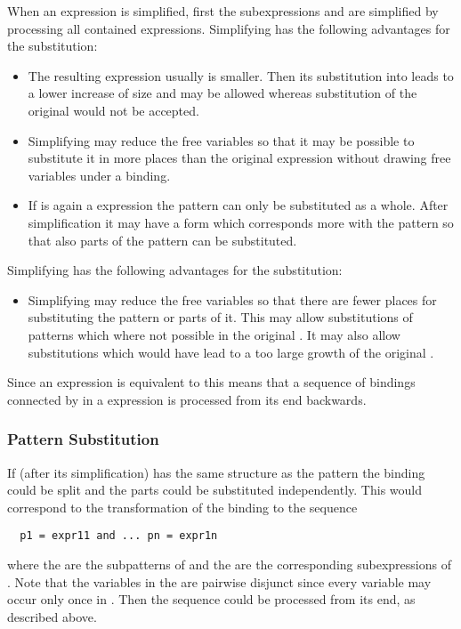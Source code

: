 When an expression  is simplified, first the subexpressions  and  are
simplified by processing all contained  expressions. Simplifying  has the following advantages for the 
substitution:
\begin{itemize}
\item The resulting expression usually is smaller. Then its substitution into  leads to a lower increase of
size and may be allowed whereas substitution of the original  would not be accepted.
\item Simplifying may reduce the free variables so that it may be possible to substitute it in more places than
the original expression without drawing free variables under a binding.
\item If  is again a  expression the pattern can only be substituted as a whole. After simplification 
it may have a form which corresponds more with the pattern so that also parts of the pattern can be substituted.
\end{itemize}
Simplifying  has the following advantages for the substitution:
\begin{itemize}
\item Simplifying may reduce the free variables so that there are fewer places for substituting the pattern
or parts of it. This may allow substitutions of patterns which where not possible in the original .
It may also allow substitutions which would have lead to a too large growth of the original .
\end{itemize}

Since an expression  is equivalent to  this means that a sequence of bindings connected by  in a  expression is processed
from its end backwards.

\subsubsection{Pattern Substitution}

If (after its simplification)  has the same structure as the pattern  the binding could be split and 
the parts could be substituted independently. This would correspond to the transformation of the binding 
to the sequence 
\begin{verbatim}
  p1 = expr11 and ... pn = expr1n
\end{verbatim}
where the  are the subpatterns of  and the  are the corresponding subexpressions of .
Note that the variables in the  are pairwise disjunct since every variable may occur only once in .
Then the sequence could be processed from its end, as described above.

